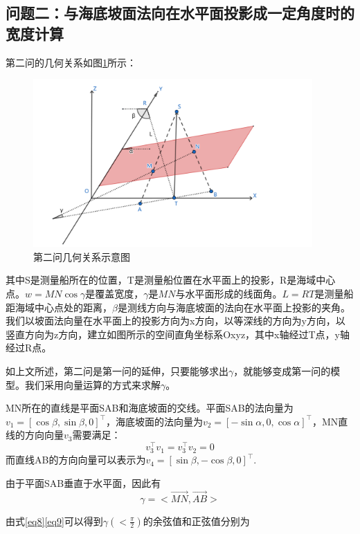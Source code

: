 \documentclass{article}
\begin{document}
\subsection{问题二：与海底坡面法向在水平面投影成一定角度时的宽度计算}
	\par 第二问的几何关系如图\ref{pro2Geo}所示：
	\begin{figure}[H]
		\centering  %
		\includegraphics[width=0.95\textwidth]{问题二//第二题几何关系示意图}
		\caption{第二问几何关系示意图}
		\label{pro2Geo}
	\end{figure}
	其中S是测量船所在的位置，T是测量船位置在水平面上的投影，R是海域中心点。$w=MN\cos\gamma$是覆盖宽度，$\gamma$是$MN$与水平面形成的线面角。$L=RT$是测量船距海域中心点处的距离，$\beta$是测线方向与海底坡面的法向在水平面上投影的夹角。我们以坡面法向量在水平面上的投影方向为x方向，以等深线的方向为y方向，以竖直方向为z方向，建立如图所示的空间直角坐标系Oxyz，其中x轴经过T点，y轴经过R点。
	\par 如上文所述，第二问是第一问的延伸，只要能够求出$\gamma$，就能够变成第一问的模型。我们采用向量运算的方式来求解$\gamma$。
	\par MN所在的直线是平面SAB和海底坡面的交线。平面SAB的法向量为$v_1=[\cos\beta,\sin\beta,0]^\top$，海底坡面的法向量为$v_2=[-\sin\alpha,0,\cos\alpha]^\top$，MN直线的方向向量$v_3$需要满足：
	\begin{equation}
		v_3^\top v_1 = v_3^\top v_2 = 0  \label{eq8}
	\end{equation}
	而直线AB的方向向量可以表示为$v_4 = [\sin\beta,-\cos\beta,0]^\top$.
	\par 由于平面SAB垂直于水平面，因此有
	\begin{equation}
		\gamma = <\vec{MN},\vec{AB}> \label{eq9}
	\end{equation}
	\par 由式\eqref{eq8}\eqref{eq9}可以得到$\gamma(<\frac{\pi}{2})$的余弦值和正弦值分别为
\end{document}
